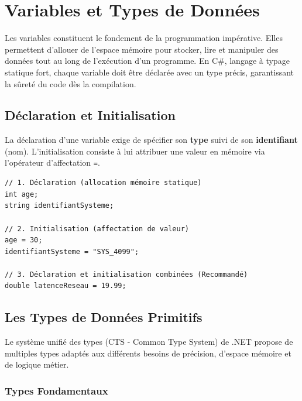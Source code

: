 
\newpage
\section{Variables et Types de Données}

Les variables constituent le fondement de la programmation impérative. Elles permettent d'allouer de l'espace mémoire pour stocker, lire et manipuler des données tout au long de l'exécution d'un programme. En C\#, langage à typage statique fort, chaque variable doit être déclarée avec un type précis, garantissant la sûreté du code dès la compilation.

\subsection{Déclaration et Initialisation}

La déclaration d'une variable exige de spécifier son \textbf{type} suivi de son \textbf{identifiant} (nom). L'initialisation consiste à lui attribuer une valeur en mémoire via l'opérateur d'affectation \texttt{=}.

\begin{lstlisting}[caption={Déclaration et initialisation standard}]
// 1. Déclaration (allocation mémoire statique)
int age;
string identifiantSysteme;

// 2. Initialisation (affectation de valeur)
age = 30;
identifiantSysteme = "SYS_4099";

// 3. Déclaration et initialisation combinées (Recommandé)
double latenceReseau = 19.99;
\end{lstlisting}

\subsection{Les Types de Données Primitifs}

Le système unifié des types (CTS - Common Type System) de .NET propose de multiples types adaptés aux différents besoins de précision, d'espace mémoire et de logique métier.

\subsubsection{Types Fondamentaux}

